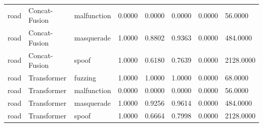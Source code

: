 \begin{tabular}{llllllll}
road & Concat-Fusion & malfunction & 0.0000 & 0.0000 & 0.0000 & 0.0000 & 56.0000 \\
road & Concat-Fusion & masquerade & 1.0000 & 0.8802 & 0.9363 & 0.0000 & 484.0000 \\
road & Concat-Fusion & spoof & 1.0000 & 0.6180 & 0.7639 & 0.0000 & 2128.0000 \\
road & Transformer & fuzzing & 1.0000 & 1.0000 & 1.0000 & 0.0000 & 68.0000 \\
road & Transformer & malfunction & 0.0000 & 0.0000 & 0.0000 & 0.0000 & 56.0000 \\
road & Transformer & masquerade & 1.0000 & 0.9256 & 0.9614 & 0.0000 & 484.0000 \\
road & Transformer & spoof & 1.0000 & 0.6664 & 0.7998 & 0.0000 & 2128.0000 \\
\bottomrule
\end{tabular}
